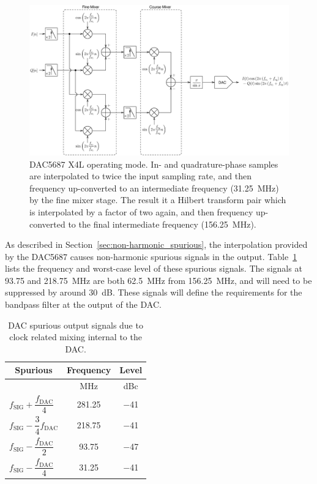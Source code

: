 \documentclass[12pt,letterpaper]{article}
\begin{document}
\begin{figure}[htbp]
  \centering
  \includegraphics[scale=0.65]{dac5687-x4l.eps}
  \caption{DAC5687 X4L operating mode. In- and quadrature-phase
    samples are interpolated to twice the input sampling rate, and then
    frequency up-converted to an intermediate frequency (31.25~MHz) by
    the fine mixer stage. The result it a Hilbert transform pair which
    is interpolated by a factor of two again, and then frequency
    up-converted to the final intermediate frequency (156.25~MHz).}
  \label{fig:dac5687-x4l}
\end{figure}

As described in Section~\ref{sec:non-harmonic_spurious}, the
interpolation provided by the DAC5687 causes non-harmonic spurious
signals in the output. Table~\ref{tab:spurious} lists the frequency
and worst-case level of these spurious signals. The signals at 93.75
and 218.75~MHz are both 62.5~MHz from 156.25~MHz, and will need to be
suppressed by around 30~dB. These signals will define the requirements
for the bandpass filter at the output of the DAC.

\begin{table}[htbp]
  \centering
  \caption{DAC spurious output signals due to clock related mixing
    internal to the DAC.}
  \label{tab:spurious}
  \vspace{0.5em}
  \begin{tabular}{|l|c|c|}
    \hline
    \multicolumn{1}{|c|}{\textbf{Spurious}} & \textbf{Frequency} & \textbf{Level} \\
    \hline
    & \multicolumn{1}{c|}{MHz} & \multicolumn{1}{c|}{dBc} \\
    \hline
    $f_\text{SIG}+\dfrac{f_\text{DAC}}{4}$  & 281.25 & $-$41 \\
    \hline
    $f_\text{SIG}-\dfrac{3}{4}f_\text{DAC}$ & 218.75 & $-$41 \\
    \hline
    $f_\text{SIG}-\dfrac{f_\text{DAC}}{2}$ & 93.75 & $-$47 \\
    \hline
    $f_\text{SIG}-\dfrac{f_\text{DAC}}{4}$ & 31.25 & $-$41 \\
    \hline
  \end{tabular}
\end{table}
\end{document}
